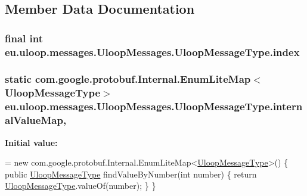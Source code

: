 \subsection{Member Data Documentation}
\hypertarget{enumeu_1_1uloop_1_1messages_1_1UloopMessages_1_1UloopMessageType_aec1ce079512854d8a1e703fe37dcfd29}{
\subsubsection[{index}]{\setlength{\rightskip}{0pt plus 5cm}final int eu.\+uloop.\+messages.\+Uloop\+Messages.\+Uloop\+Message\+Type.\+index\hspace{0.3cm}{\ttfamily [private]}}}\label{enumeu_1_1uloop_1_1messages_1_1UloopMessages_1_1UloopMessageType_aec1ce079512854d8a1e703fe37dcfd29}
\hypertarget{enumeu_1_1uloop_1_1messages_1_1UloopMessages_1_1UloopMessageType_afb6e1f733b8bcb79ab024acc56156437}{
\subsubsection[{internal\+Value\+Map}]{\setlength{\rightskip}{0pt plus 5cm} static  com.\+google.\+protobuf.\+Internal.\+Enum\+Lite\+Map$<${\bf Uloop\+Message\+Type}$>$ eu.\+uloop.\+messages.\+Uloop\+Messages.\+Uloop\+Message\+Type.\+internal\+Value\+Map\hspace{0.3cm}{\ttfamily [static]}, {\ttfamily [private]}}}\label{enumeu_1_1uloop_1_1messages_1_1UloopMessages_1_1UloopMessageType_afb6e1f733b8bcb79ab024acc56156437}
{\bfseries Initial value\+:}
\begin{DoxyCode}
=
          \textcolor{keyword}{new} com.google.protobuf.Internal.EnumLiteMap<\hyperlink{enumeu_1_1uloop_1_1messages_1_1UloopMessages_1_1UloopMessageType_a47bcc9408a8b6ebadc16ecf51e38ab5a}{UloopMessageType}>() \{
            \textcolor{keyword}{public} \hyperlink{enumeu_1_1uloop_1_1messages_1_1UloopMessages_1_1UloopMessageType_a47bcc9408a8b6ebadc16ecf51e38ab5a}{UloopMessageType} findValueByNumber(\textcolor{keywordtype}{int} number) \{
              \textcolor{keywordflow}{return} \hyperlink{enumeu_1_1uloop_1_1messages_1_1UloopMessages_1_1UloopMessageType_a47bcc9408a8b6ebadc16ecf51e38ab5a}{UloopMessageType}.valueOf(number);
            \}
          \}
\end{DoxyCode}
